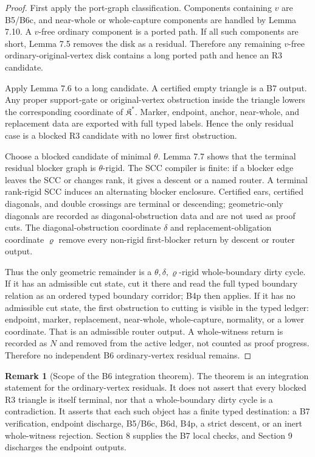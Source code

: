 \documentclass[11pt]{amsart}
\theoremstyle{definition}
\newtheorem{remark}[theorem]{Remark}
\begin{document}
\begin{proof}
First apply the port-graph classification. Components containing \(v\) are B5/B6c, and near-whole or whole-capture components are handled by Lemma 7.10. A \(v\)-free ordinary component is a ported path. If all such components are short, Lemma 7.5 removes the disk as a residual. Therefore any remaining \(v\)-free ordinary-original-vertex disk contains a long ported path and hence an R3 candidate.

Apply Lemma 7.6 to a long candidate. A certified empty triangle is a B7 output. Any proper support-gate or original-vertex obstruction inside the triangle lowers the corresponding coordinate of \(\mathfrak K^\ast\). Marker, endpoint, anchor, near-whole, and replacement data are exported with full typed labels. Hence the only residual case is a blocked R3 candidate with no lower first obstruction.

Choose a blocked candidate of minimal \(\theta\). Lemma 7.7 shows that the terminal residual blocker graph is \(\theta\)-rigid. The SCC compiler is finite: if a blocker edge leaves the SCC or changes rank, it gives a descent or a named router. A terminal rank-rigid SCC induces an alternating blocker enclosure. Certified ears, certified diagonals, and double crossings are terminal or descending; geometric-only diagonals are recorded as diagonal-obstruction data and are not used as proof cuts. The diagonal-obstruction coordinate \(\delta\) and replacement-obligation coordinate \(\varrho\) remove every non-rigid first-blocker return by descent or router output.

Thus the only geometric remainder is a \(\theta,\delta,\varrho\)-rigid whole-boundary dirty cycle. If it has an admissible cut state, cut it there and read the full typed boundary relation as an ordered typed boundary corridor; B4p then applies. If it has no admissible cut state, the first obstruction to cutting is visible in the typed ledger: endpoint, marker, replacement, near-whole, whole-capture, normality, or a lower coordinate. That is an admissible router output. A whole-witness return is recorded as \(N\) and removed from the active ledger, not counted as proof progress. Therefore no independent B6 ordinary-vertex residual remains.

\end{proof}
\begin{remark}[Scope of the B6 integration theorem]
The theorem is an
integration statement for the ordinary-vertex residuals. It does not assert
that every blocked R3 triangle is itself terminal, nor that a whole-boundary
dirty cycle is a contradiction. It asserts that each such object has a finite
typed destination: a B7 verification, endpoint discharge, B5/B6c, B6d, B4p, a
strict descent, or an inert whole-witness rejection. Section 8 supplies the B7
local checks, and Section 9 discharges the endpoint outputs.

\end{remark}
\end{document}
